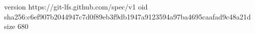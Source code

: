 version https://git-lfs.github.com/spec/v1
oid sha256:c6ef907b2044947c7d0f89eb3f9db1947a9123594a97ba4695caafad9c48a21d
size 680
